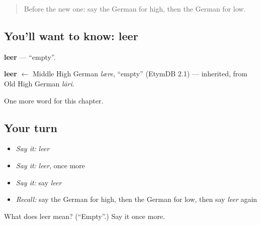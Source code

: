 \begin{quote}
Before the new one: say the German for high, then the German for low.
\end{quote}

\subsection*{You'll want to know: leer}
\textbf{leer} — \textquotedblleft{}empty\textquotedblright{}.

\begin{cousinweb}
\textbf{leer} $\leftarrow$ Middle High German \emph{lære}, \textquotedblleft{}empty\textquotedblright{} (EtymDB 2.1) — inherited, from Old High German \emph{lāri}.
\end{cousinweb}

\begin{grammarlens}[title={What you've built}]
One more word for this chapter.
\end{grammarlens}

\subsection*{Your turn}
\begin{itemize}
\raggedright
  \item \emph{Say it:} \emph{leer}
  \item \emph{Say it:} \emph{leer}, once more
  \item \emph{Say it:} say \emph{leer}
  \item \emph{Recall:} say the German for high, then the German for low, then say \emph{leer} again
\end{itemize}

\begin{tcolorbox}[breakable,colback=teal!4,colframe=teal!35!black,title={Before you move on}]
What does leer mean? (\textquotedblleft{}Empty\textquotedblright{}.) Say it once more.
\end{tcolorbox}
